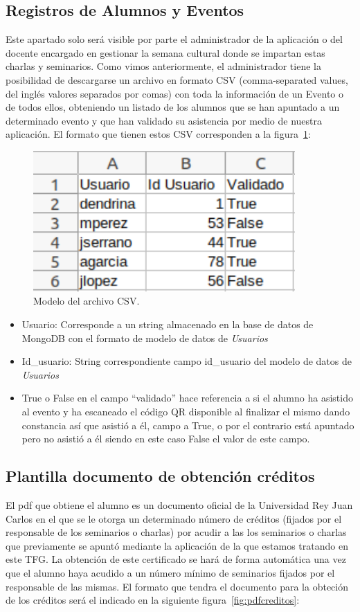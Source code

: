 \documentclass[a4paper, 12pt]{book}
\begin{document}
\subsection{Registros de Alumnos y Eventos}
	Este apartado solo será visible por parte el administrador de la aplicación o del docente encargado en gestionar la semana cultural donde se impartan estas charlas y seminarios. Como vimos anteriormente, el administrador tiene la posibilidad de descargarse un archivo en formato CSV (comma-separated values, del inglés valores separados por comas) con toda la información de un Evento o de todos ellos, obteniendo un listado de los alumnos que se han apuntado a un determinado evento y que han validado su asistencia por medio de nuestra aplicación.
	El formato que tienen estos CSV corresponden a la figura~\ref{fig:CSVAlumnos}:
	\begin{figure}
  	\centering
  	\includegraphics[width=10cm, keepaspectratio]{img/CSVAlumnos.png}
  	\caption{Modelo del archivo CSV.}\label{fig:CSVAlumnos}
	\end{figure}
	\begin{itemize}
		\item Usuario: Corresponde a un string almacenado en la base de datos de MongoDB con el formato de modelo de datos de \textit{Usuarios}
		\item Id\_usuario: String correspondiente campo id\_usuario del modelo de datos de \textit{Usuarios}
		\item True o False en el campo ``validado'' hace referencia a si el alumno ha asistido al evento y ha escaneado el código QR disponible al finalizar el mismo dando constancia así que asistió a él, campo a True, o por el contrario está apuntado pero no asistió a él siendo en este caso False el valor de este campo.
	\end{itemize}
	

\subsection{Plantilla documento de obtención créditos}
	El pdf que obtiene el alumno es un documento oficial de la Universidad Rey Juan Carlos en el que se le otorga un determinado número de créditos (fijados por el responsable de los seminarios o charlas) por acudir a las los seminarios o charlas que previamente se apuntó mediante la aplicación de la que estamos tratando en este TFG. La obtención de este certificado se hará de forma automática una vez que el alumno haya acudido a un número mínimo de seminarios fijados por el responsable de las mismas. 
	El formato que tendra el documento para la obteción de los créditos será el indicado en la siguiente figura~\ref{fig:pdfcreditos}:
	
\end{document}
